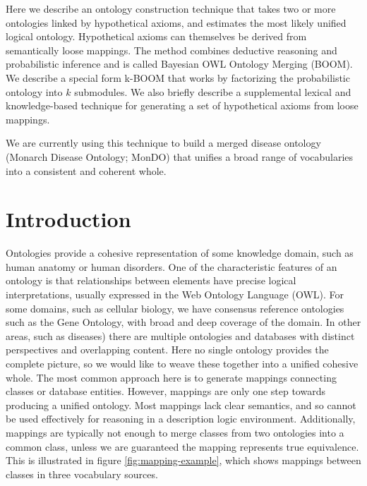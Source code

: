 \documentclass{my}
\begin{document}
Here we describe an ontology construction technique that takes
two or more ontologies linked by hypothetical axioms, and estimates
the most likely unified logical ontology. Hypothetical axioms can
themselves be derived from semantically loose mappings. The method
combines deductive reasoning and probabilistic inference and is called
Bayesian OWL Ontology Merging (BOOM). We describe a special form
k-BOOM that works by factorizing the probabilistic ontology into $k$
submodules. We also briefly describe a supplemental lexical and
knowledge-based technique for generating a set of hypothetical axioms
from loose mappings.

We are currently using this technique to build a merged disease
ontology (Monarch Disease Ontology; MonDO) that unifies a broad range
of vocabularies into a consistent and coherent whole.


\section{Introduction}

Ontologies provide a cohesive representation of some knowledge domain,
such as human anatomy or human disorders. One of the
characteristic features of an ontology is that relationships between
elements have precise logical interpretations, usually expressed in the Web
Ontology Language (OWL). For some domains, such as cellular biology,
we have consensus reference ontologies such as the Gene Ontology, with
broad and deep coverage of the domain. In other areas, such as
diseases) there are multiple ontologies and databases with distinct
perspectives and overlapping content. Here no single ontology provides
the complete picture, so we would like to weave these together into a
unified cohesive whole. The most common approach here is to generate
mappings connecting classes or database entities. However, mappings
are only one step towards producing a unified ontology. Most mappings
lack clear semantics, and so cannot be used effectively for reasoning
in a description logic environment. Additionally, mappings are
typically not enough to merge classes from two ontologies into a
common class, unless we are guaranteed the mapping represents true
equivalence. This is illustrated in figure \ref{fig:mapping-example},
which shows mappings between classes in three vocabulary
sources.
\end{document}
